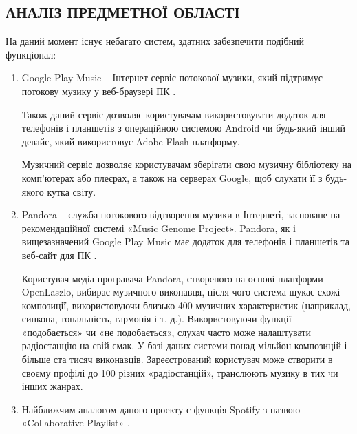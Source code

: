 \begin{center}\chapter{АНАЛІЗ ПРЕДМЕТНОЇ ОБЛАСТІ}\end{center}

    На даний момент існує небагато систем, здатних забезпечити подібний функціонал:
    \begin{enumerate}[label=\alph*)]
        \item
            Google Play Music – Інтернет-сервіс потокової музики, який підтримує потокову музику у веб-браузері ПК .


            Також даний сервіс дозволяє користувачам використовувати додаток для телефонів і планшетів з операційною системою Android чи будь-який інший девайс, який використовує Adobe Flash платформу.

            Музичний сервіс дозволяє користувачам зберігати свою музичну бібліотеку на комп’ютерах або плеєрах, а також на серверах Google, щоб слухати її з будь-якого кутка світу.
        \item
            Pandora – служба потокового відтворення музики в Інтернеті, засноване на рекомендаційної системі «Music Genome Project». Pandora, як і вищезазначений Google Play Music має додаток для телефонів і планшетів та веб-сайт для ПК .


            Користувач медіа-програвача Pandora, створеного на основі платформи OpenLaszlo, вибирає музичного виконавця, після чого система шукає схожі композиції, використовуючи близько 400 музичних характеристик (наприклад, синкопа, тональність, гармонія і т. д.). Використовуючи функції «подобається» чи «не подобається», слухач часто може налаштувати радіостанцію на свій смак. У базі даних системи понад мільйон композицій і більше ста тисяч виконавців. Зареєстрований користувач може створити в своєму профілі до 100 різних «радіостанцій», транслюють музику в тих чи інших жанрах.

        \item
            Найближчим аналогом даного проекту є функція  Spotify з назвою «Collaborative Playlist» .



\end{enumerate}
